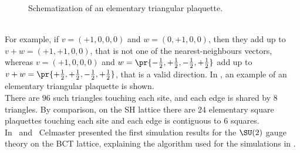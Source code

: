 \begin{figure}[!hbtp]
    \centering
    \caption{Schematization of an elementary triangular plaquette.}
    \label{3F:PlaqTriang}
\end{figure}\\
For example, if $v=(+1,0,0,0)$ and $w=(0,+1,0,0)$, then they add up to $v+w=(+1,+1,0,0)$, that is not one of the nearest-neighbours vectors, whereas $v=(+1,0,0,0)$ and $w=\pr{-\frac12,+\frac12,-\frac12,+\frac12}$ add up to $v+w=\pr{+\frac12,+\frac12,-\frac12,+\frac12}$, that is a valid direction.
In , an example of an elementary triangular plaquette is shown.\\
There are $96$ such triangles touching each site, and each edge is shared by $8$ triangles.
By comparison, on the SH lattice there are $24$ elementary square plaquettes touching each site and each edge is contiguous to $6$ squares.\\
In~\cite{Celmaster:1983hs} and~\cite{Celmaster:1983vy} Celmaster presented the first simulation results for the $\SU(2)$ gauge theory on the BCT lattice, explaining the algorithm used for the simulations in \cite{CELMASTER1985415}.

